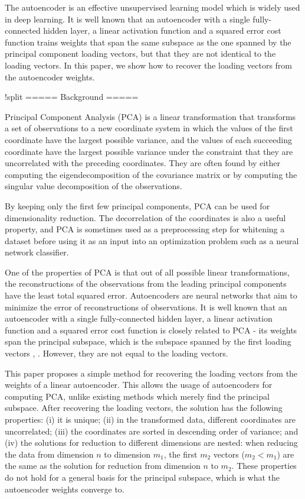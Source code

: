 The autoencoder is an effective unsupervised learning model which is
widely used in deep learning. It is well known that an autoencoder
with a single fully-connected hidden layer, a linear activation
function and a squared error cost function trains weights that span
the same subspace as the one spanned by the principal component
loading vectors, but that they are not identical to the loading
vectors. In this paper, we show how to recover the loading vectors
from the autoencoder weights.

!split
===== Background =====

Principal Component Analysis (PCA) is a linear transformation that
transforms a set of observations to a new coordinate system in which
the values of the first coordinate have the largest possible variance,
and the values of each succeeding coordinate have the largest possible
variance under the constraint that they are uncorrelated with the
preceding coordinates. They are often found by either computing the
eigendecomposition of the covariance matrix or by computing the
singular value decomposition of the observations.

By keeping only the first few principal components, PCA can be used
for dimensionality reduction. The decorrelation of the coordinates is
also a useful property, and PCA is sometimes used as a preprocessing
step for whitening a dataset before using it as an input into an
optimization problem such as a neural network classifier.

One of the properties of PCA is that out of all possible linear
transformations, the reconstructions of the observations from the
leading principal components have the least total squared
error. Autoencoders are neural networks that aim to minimize the error
of reconstructions of observations. It is well known that an
autoencoder with a single fully-connected hidden layer, a linear
activation function and a squared error cost function is closely
related to PCA - its weights span the principal subspace, which is the
subspace spanned by the first loading vectors \cite{AutoencoderSVD},
\cite{WithoutLocalMinima}. However, they are not equal to the loading
vectors.

This paper proposes a simple method for recovering the loading vectors from the weights of a linear autoencoder. This allows the usage of autoencoders for computing PCA, unlike existing methods which merely find the principal subspace. After recovering the loading vectors, the solution has the following properties: (i) it is unique; (ii) in the transformed data, different coordinates are uncorrelated; (iii) the coordinates are sorted in descending order of variance; and (iv) the solutions for reduction to different dimensions are nested: when reducing the data from dimension $n$ to dimension $m_1$, the first $m_2$ vectors ($m_2 < m_1$) are the same as the solution for reduction from dimension $n$ to $m_2$. These properties do not hold for a general basis for the principal subspace, which is what the autoencoder weights converge to.

